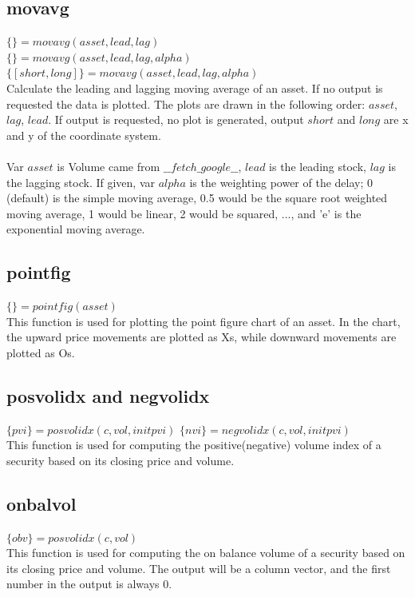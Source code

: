 \documentclass[11pt]{article}
\begin{document}
\subsection{movavg}
$\{\} = movavg (asset, lead, lag)$
\\$\{\} = movavg (asset, lead, lag, alpha)$
\\$\{[short, long] \} = movavg (asset, lead, lag, alpha)$
\\Calculate the leading and lagging moving average of an asset. If no output is requested the data is plotted.  The plots are drawn in the following order: $asset$, $lag$, $lead$.  If output is requested, no plot is generated, output $short$ and $long$ are x and y of the coordinate system.
\\
\\Var $asset$ is Volume came from $\_\_fetch\_google\_\_$, $lead$ is the leading stock,  $lag$ is the lagging stock. If given, var $alpha$ is the weighting power of the delay; 0 (default) is the simple moving average, 0.5 would be the square root weighted moving average, 1 would be linear, 2 would be squared, ..., and 'e' is the exponential moving average.

\subsection{pointfig}
$\{\} = pointfig (asset)$
\\ This function is used for plotting the point figure chart of an asset. In the chart, the upward price movements are plotted as Xs, while downward movements are plotted as Os.

\subsection{posvolidx and negvolidx}
$\{pvi\} = posvolidx (c, vol, initpvi)$
$\{nvi\} = negvolidx (c, vol, initpvi)$
\\ This function is used for computing the positive(negative) volume index of a security based on its closing price and volume.

\subsection{onbalvol}
$\{obv\} = posvolidx (c, vol)$
\\ This function is used for computing the on balance volume of a security based on its closing price and volume. The output will be a column vector, and the first number in the output is always 0.
\end{document}
